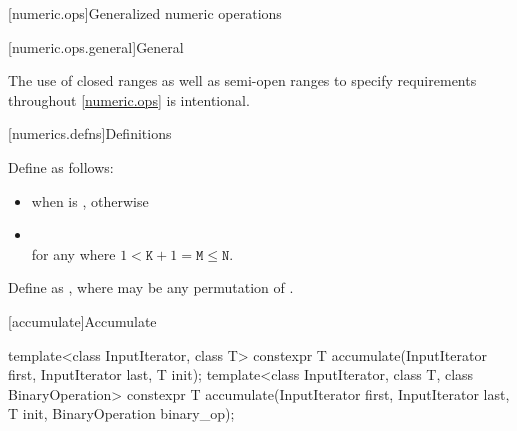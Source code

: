 [numeric.ops]{Generalized numeric operations}

[numeric.ops.general]{General}

\pnum
\begin{note}
The use of closed ranges as well as semi-open ranges
to specify requirements throughout \ref{numeric.ops} is intentional.
\end{note}

[numerics.defns]{Definitions}

%
\pnum
Define 
as follows:
\begin{itemize}
\item
{} when  is , otherwise

\item
{} \\
for any  where $1 < \mathtt{K}+1 = \mathtt{M} \leq \mathtt{N}$.
\end{itemize}

%
\pnum
Define  as
,
where
 may be any permutation of .

[accumulate]{Accumulate}

%
\begin{itemdecl}
template<class InputIterator, class T>
  constexpr T accumulate(InputIterator first, InputIterator last, T init);
template<class InputIterator, class T, class BinaryOperation>
  constexpr T accumulate(InputIterator first, InputIterator last, T init,
                         BinaryOperation binary_op);
\end{itemdecl}

